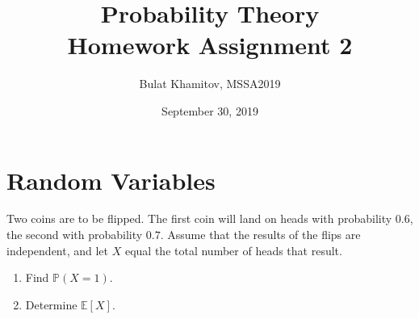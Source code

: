 \documentclass{article}[12pt]
\title{Probability Theory \\ Homework Assignment 2}
\author{Bulat Khamitov, MSSA2019}
\date{September 30, 2019}
\newenvironment{problem}[1]
  {\renewcommand\theinnercustomprblm{#1}\innercustomprblm}
  {\endinnercustomprblm}
\newcommand{\E}{\mathbb{E}}
\begin{document}
\maketitle

\section{Random Variables}

\begin{problem}{4.25}\normalfont
Two coins are to be flipped. 
The first coin will land on heads with probability $0.6$, the second with probability $0.7$. 
Assume that the results of the flips are independent, and let $X$ equal the total number of heads that result.
\begin{enumerate}[label=(\alph*)]
    \item Find $\mathbb{P}(X = 1)$.
    \item Determine $\E[X]$.
\end{enumerate}
\end{problem}
\end{document}
